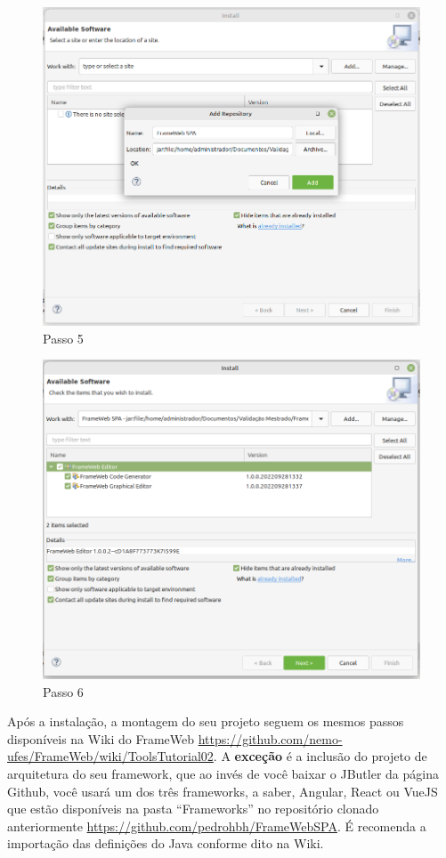 \documentclass[
article,			%
11pt,				%
oneside,			%
a4paper,			%
english,			%
brazil,				%
sumario=tradicional
]{abntex2}
\begin{document}
\begin{figure}
	\centering
	\includegraphics[width=0.7\linewidth]{"figuras/Tutorial 2"}
	\caption{Passo 5}
	\label{fig:tutorial-2}
\end{figure}

\begin{figure}
	\centering
	\includegraphics[width=0.7\linewidth]{"figuras/Tutorial 3"}
	\caption{Passo 6}
	\label{fig:tutorial-3}
\end{figure}

Após a instalação, a montagem do seu projeto seguem os mesmos passos disponíveis na Wiki do FrameWeb \url{https://github.com/nemo-ufes/FrameWeb/wiki/ToolsTutorial02}. A \textbf{exceção} é a inclusão do projeto de arquitetura do seu framework, que ao invés de você baixar o JButler da página Github, você usará um dos três frameworks, a saber, Angular, React ou VueJS que estão disponíveis na pasta ``Frameworks'' no repositório clonado anteriormente \url{https://github.com/pedrohbh/FrameWebSPA}. É recomenda a importação das definições do Java conforme dito na Wiki.
\end{document}
